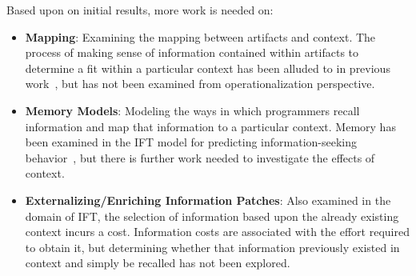 Based upon on initial results, more work is needed on:
\begin{itemize}[leftmargin=6pt, parsep=0pt, topsep=0pt]
\item \textbf{Mapping}: Examining the mapping between artifacts and context. The process of making sense of information contained within artifacts to determine a fit within a particular context has been alluded to in previous work~\cite{Pirolli:2005}, but has not been examined from operationalization perspective.
\item \textbf{Memory Models}: Modeling the ways in which programmers recall information and map that information to a particular context. Memory has been examined in the IFT model for predicting information-seeking behavior~\cite{Lawrance:2010,Lawrance:2013}, but there is further work needed to investigate the effects of context.
\item \textbf{Externalizing/Enriching Information Patches}: Also examined in the domain of IFT, the selection of information based upon the already existing context incurs a cost. Information costs are associated with the effort required to obtain it, but determining whether that information previously existed in context and simply be recalled has not been explored.
\end{itemize}